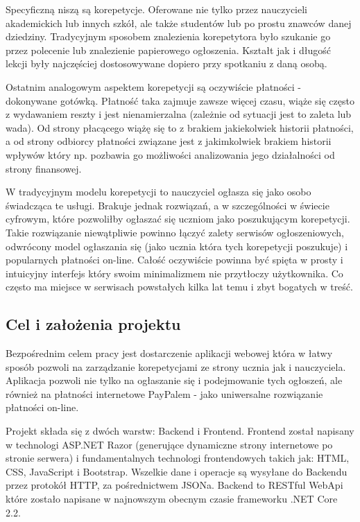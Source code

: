 \documentclass[12pt]{article}
\numberwithin{figure}{section}
\begin{document}
Specyficzną niszą są korepetycje. Oferowane nie tylko przez nauczycieli akademickich lub innych szkół, ale także studentów lub po prostu znawców danej dziedziny. Tradycyjnym sposobem znalezienia korepetytora było szukanie go przez polecenie lub znalezienie papierowego ogłoszenia. Kształt jak i długość lekcji były najczęściej dostosowywane dopiero przy spotkaniu z daną osobą.

Ostatnim analogowym aspektem korepetycji są oczywiście płatności - dokonywane gotówką. Płatność taka zajmuje zawsze więcej czasu, wiąże się często z wydawaniem reszty i jest nienamierzalna (zależnie od sytuacji jest to zaleta lub wada). Od strony płacącego wiążę się to z brakiem jakiekolwiek historii płatności, a od strony odbiorcy płatności związane jest z jakimkolwiek brakiem historii wpływów który np. pozbawia go możliwości analizowania jego działalności od strony finansowej. 

W tradycyjnym modelu korepetycji to nauczyciel ogłasza się jako osobo świadcząca te usługi. Brakuje jednak rozwiązań, a w szczególności w świecie cyfrowym, które pozwoliłby ogłaszać się uczniom jako poszukującym korepetycji. Takie rozwiązanie niewątpliwie powinno łączyć zalety serwisów ogłoszeniowych, odwrócony model ogłaszania się (jako ucznia która tych korepetycji poszukuje) i popularnych płatności on-line. Całość oczywiście powinna być spięta w prosty i intuicyjny interfejs który swoim minimalizmem nie przytłoczy użytkownika. Co często ma miejsce w serwisach powstałych kilka lat temu i zbyt bogatych w treść.
\subsection{Cel i założenia projektu}
Bezpośrednim celem pracy jest dostarczenie aplikacji webowej która w łatwy sposób pozwoli na zarządzanie korepetycjami ze strony ucznia jak i nauczyciela. Aplikacja pozwoli nie tylko na ogłaszanie się i podejmowanie tych ogłoszeń, ale również na płatności internetowe PayPalem - jako uniwersalne rozwiązanie płatności on-line. 

Projekt składa się z dwóch warstw: Backend i Frontend.
Frontend został napisany w technologi ASP.NET Razor (generujące dynamiczne strony internetowe po stronie serwera) i fundamentalnych technologi frontendowych takich jak: HTML, CSS, JavaScript i Bootstrap. Wszelkie dane i operacje są wysyłane do Backendu przez protokół HTTP, za pośrednictwem JSONa. 
Backend to RESTful WebApi które zostało napisane w najnowszym obecnym czasie frameworku .NET Core 2.2.
\end{document}
